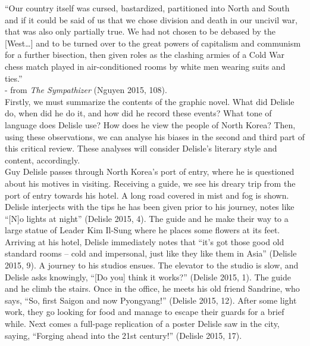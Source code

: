 \documentclass{article}
\begin{document}
“Our country itself was cursed, bastardized, partitioned into North and South and if it could be said of us that we chose division and death in our uncivil war, that was also only partially true. We had not chosen to be debased by the [West…] and to be turned over to the great powers of capitalism and communism for a further bisection, then given roles as the clashing armies of a Cold War chess match played in air-conditioned rooms by white men wearing suits and ties.” 
\\ - from \textit{The Sympathizer} (Nguyen 2015, 108). \\

\newline \qquad Firstly, we must summarize the contents of the graphic novel. What did Delisle do, when did he do it, and how did he record these events? What tone of language does Delisle use? How does he view the people of North Korea? Then, using these observations, we can analyse his biases in the second and third part of this critical review. These analyses will consider Delisle’s literary style and content, accordingly. \\


\newline \qquad Guy Delisle passes through North Korea’s port of entry, where he is questioned about his motives in visiting. Receiving a guide, we see his dreary trip from the port of entry towards his hotel. A long road covered in mist and fog is shown. Delisle interjects with the tips he has been given prior to his journey, notes like “[N]o lights at night” (Delisle 2015, 4). The guide and he make their way to a large statue of Leader Kim Il-Sung where he places some flowers at its feet.
\\

\newline Arriving at his hotel, Delisle immediately notes that “it’s got those good old standard rooms – cold and impersonal, just like they like them in Asia” (Delisle 2015, 9). A journey to his studios ensues. The elevator to the studio is slow, and Delisle asks knowingly, “[Do you] think it works?” (Delisle 2015, 1). The guide and he climb the stairs. Once in the office, he meets his old friend Sandrine, who says, “So, first Saigon and now Pyongyang!” (Delisle 2015, 12). After some light work, they go looking for food and manage to escape their guards for a brief while. Next comes a full-page replication of a poster Delisle saw in the city, saying, “Forging ahead into the 21st century!” (Delisle 2015, 17). \\
\end{document}
